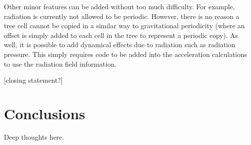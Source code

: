 Other minor features can be added without too much difficulty. For example, radiation is currently not allowed to be periodic. However, there is no reason a tree cell cannot be copied in a similar way to gravitational periodicity (where an offset is simply added to each cell in the tree to represent a periodic copy). As well, it is possible to add dynamical effects due to radiation such as radiation pressure. This simply requires code to be added into the acceleration calculations to use the radiation field information.

[closing statement?]

\section{Conclusions}
\label{sec:conclusion}

Deep thoughts here.
